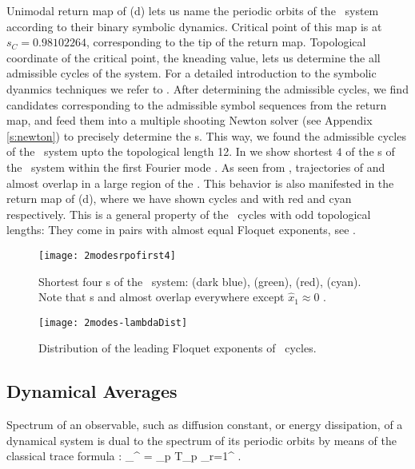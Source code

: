 Unimodal return map of  (d) lets us name the periodic orbits of the \twomode\ system according to their binary symbolic dynamics. Critical point of this map is at $s_C=0.98102264$, corresponding to the tip of the return map. Topological coordinate of the critical point, the kneading value, lets us determine the all admissible cycles of the system. For a detailed introduction to the symbolic dyanmics techniques we refer to . After determining the admissible cycles, we find candidates corresponding to the admissible symbol sequences from the return map, and feed them into a multiple shooting Newton solver (see Appendix \ref{s:newton}) to precisely determine the \rpo s. This way, we found the admissible cycles of the \twomode\ system upto the topological length 12. In  we show shortest $4$ of the \rpo s of the \twomode\ system within the first Fourier mode \slicePlane . As seen from , trajectories of  and  almost overlap in a large region of the \statesp . This behavior is also manifested in the return map of  (d), where we have shown cycles  and  with red and cyan respectively. This is a general property of the \twomode\ cycles with odd topological lengths: They come in pairs with almost equal Floquet exponents, see .

\begin{figure}%
\centering
 \texttt{[image: 2modesrpofirst4]}
\caption{Shortest four \rpo s of the \twomode\ system:  (dark blue),  (green),  (red),  (cyan). Note that \rpo s  and  almost overlap everywhere except $\hat{x}_1 \approx 0$ .}
\label{f-2modesrpofirst4}
\end{figure}

\begin{figure}%
\centering
 \texttt{[image: 2modes-lambdaDist]}
\caption{Distribution of the leading Floquet exponents of \twomode\ cycles.}
\label{f-2modes-lambdaDist}
\end{figure}

\subsection{Dynamical Averages}
Spectrum of an observable, such as diffusion constant, or energy dissipation, of a dynamical system is dual to the spectrum of its periodic orbits by means of the classical trace formula :
\beq
\sum_{}^{\infty}  = \sum_p T_p \sum_{r=1}^{\infty}  .

